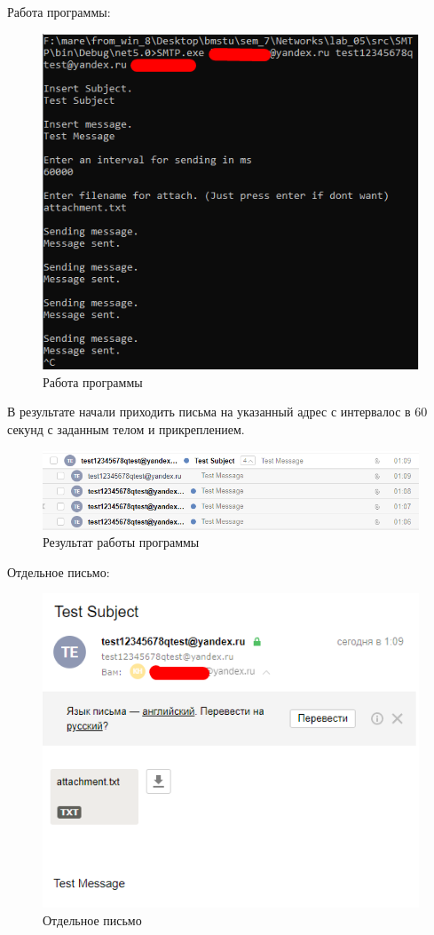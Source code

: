 \documentclass[12pt, a4paper]{extarticle}
\begin{document}
Работа программы:
\begin{figure}[H]
	\centering
	\includegraphics[scale=0.9]{images/work.png}
	\caption{Работа программы}
\end{figure}

В результате начали приходить письма на указанный адрес с интервалос в 60 секунд с заданным телом и прикреплением.

\begin{figure}[H]
	\centering
	\includegraphics[scale=0.9]{images/res.png}
	\caption{Результат работы программы}
\end{figure}

Отдельное письмо:
\begin{figure}[H]
	\centering
	\includegraphics[scale=0.9]{images/resSingle.png}
	\caption{Отдельное письмо}
\end{figure}
\end{document}

